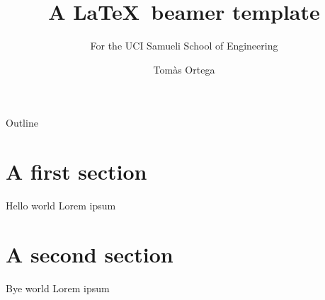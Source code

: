 \documentclass[aspectratio=169, 10pt]{beamer} %
\title[Beamer template]{A \LaTeX~beamer template}
\subtitle{For the UCI Samueli School of Engineering}
\author{Tomàs Ortega}
\institute{UCI Samueli Shcool of Engineering}
\begin{document}
\begin{frame}
    \titlepage
\end{frame}

\begin{frame}{Outline}
    \tableofcontents
\end{frame}

\section{A first section}

\begin{frame}{Hello world}
    Lorem ipsum    
\end{frame}

\section{A second section}

\begin{frame}{Bye world}
    Lorem ipsum    
\end{frame}
\end{document}
